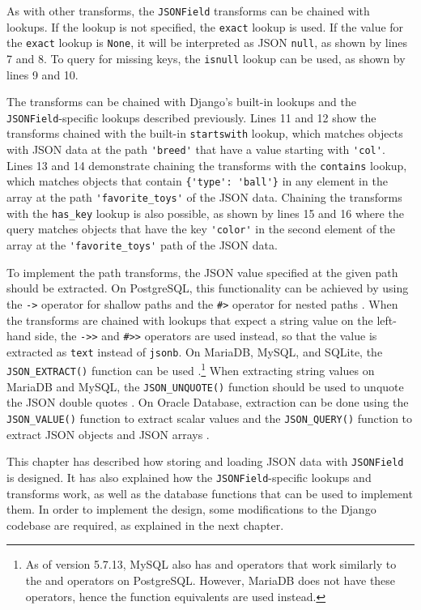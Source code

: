 As with other transforms, the \verb|JSONField| transforms can be chained with
lookups. If the lookup is not specified, the \verb|exact| lookup is used. If
the value for the \verb|exact| lookup is \verb|None|, it will be interpreted as
JSON \verb|null|, as shown by lines 7 and 8. To query for missing keys, the
\verb|isnull| lookup can be used, as shown by lines 9 and 10.

The transforms can be chained with Django's built-in lookups and the
\verb|JSONField|-specific lookups described previously. Lines 11 and 12 show
the transforms chained with the built-in \verb|startswith| lookup, which
matches objects with JSON data at the path \verb|'breed'| that have a value
starting with \verb|'col'|. Lines 13 and 14 demonstrate chaining the transforms
with the \verb|contains| lookup, which matches objects that contain
\verb|{'type': 'ball'}| in any element in the array at the path
\verb|'favorite_toys'| of the JSON data. Chaining the transforms with the
\verb|has_key| lookup is also possible, as shown by lines 15 and 16 where the
query matches objects that have the key \verb|'color'| in the second element of
the array at the \verb|'favorite_toys'| path of the JSON data.

To implement the path transforms, the JSON value specified at the given path
should be extracted. On PostgreSQL, this functionality can be achieved by using
the \verb|->| operator for shallow paths and the \verb|#>| operator for nested
paths \cite{postgres:json_operators}. When the transforms are chained with
lookups that expect a string value on the left-hand side, the \verb|->>| and
\verb|#>>| operators are used instead, so that the value is extracted as
\verb|text| instead of \verb|jsonb|. On MariaDB, MySQL, and SQLite, the
\verb|JSON_EXTRACT()| function can be used \cite{mariadb:json_extract,
mysql:json_search, sqlite:json1}.\footnote{As of version 5.7.13, MySQL also has
\code{->} and \code{->>} operators that work similarly to the \code{\#>} and
\code{\#>>} operators on PostgreSQL. However, MariaDB does not have these
operators, hence the function equivalents are used instead.} When extracting
string values on MariaDB and MySQL, the \verb|JSON_UNQUOTE()| function should be
used to unquote the JSON double quotes \cite{mariadb:json_unquote,
mysql:json_modify}. On Oracle Database, extraction can be done using the
\verb|JSON_VALUE()| function to extract scalar values and the
\verb|JSON_QUERY()| function to extract JSON objects and JSON arrays
\cite{oracle:json_value, oracle:json_query}.

This chapter has described how storing and loading JSON data with
\verb|JSONField| is designed. It has also explained how the
\verb|JSONField|-specific lookups and transforms work, as well as the database
functions that can be used to implement them. In order to implement the design,
some modifications to the Django codebase are required, as explained in the
next chapter.
